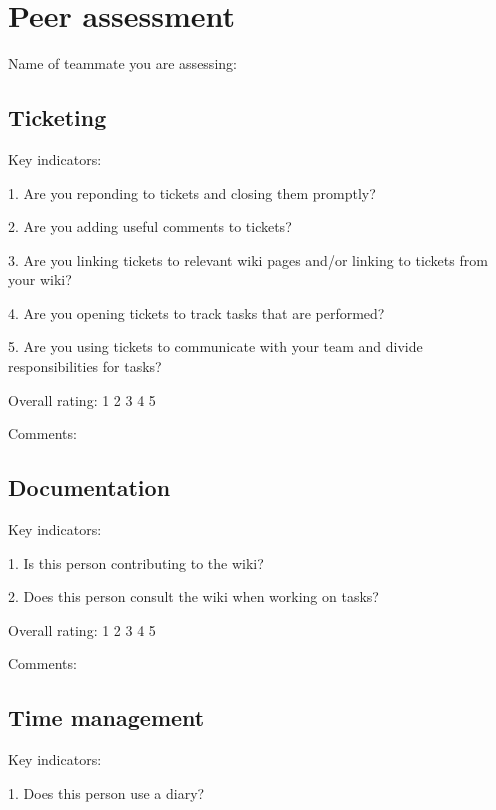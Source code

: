 \documentclass{article}   	%
\begin{document}
\vskip 4cm
    
\newpage

\section*{Peer assessment}

Name of teammate you are assessing: 
\vskip 1cm

\subsection*{Ticketing}

Key indicators: 

1.  Are you reponding to tickets and closing them promptly?

2.  Are you adding useful comments to tickets?

3.  Are you linking tickets to relevant wiki pages and/or linking to tickets from your wiki?

4.  Are you opening tickets to track tasks that are performed?

5.  Are you using tickets to communicate with your team and divide responsibilities for tasks?

Overall rating: \hskip 1cm 1 \hskip 1cm 2 \hskip 1cm 3 \hskip 1cm 4 \hskip 1cm 5 

Comments:

\vskip 4cm



\subsection*{Documentation}

Key indicators: 

1.  Is this person contributing to the wiki?

2.  Does this person consult the wiki when working on tasks?

Overall rating: \hskip 1cm 1 \hskip 1cm 2 \hskip 1cm 3 \hskip 1cm 4 \hskip 1cm 5 

Comments:

\vskip 4cm

\subsection*{Time management}

Key indicators: 

1.  Does this person  use a diary?
\end{document}
